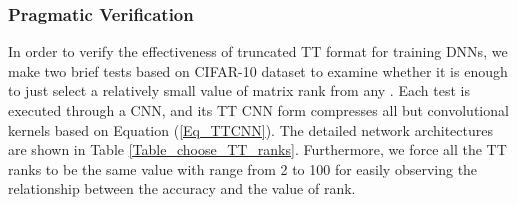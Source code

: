 \documentclass[a4paper,fleqn]{cas-dc}
\begin{document}
\subsubsection{Pragmatic Verification}\quad

In order to verify the effectiveness of truncated TT format for training DNNs, we make two brief tests based on CIFAR-10 dataset \citep{Alex_2009_CIFAR10} to examine whether it is enough to just select a relatively small value of matrix rank from any . Each test is executed through a CNN, and its TT CNN form compresses all but  convolutional kernels based on Equation (\ref{Eq_TTCNN}). The detailed network architectures are shown in Table \ref{Table_choose_TT_ranks}. Furthermore, we force all the TT ranks to be the same value with range from 2 to 100 for easily observing the relationship between the accuracy and the value of rank.

\begin{table*}
\caption{\textbf{Design of CNNs for verifying the principle to select TT ranks.} Thereinto, each content in ``Conv'' and ``Shape'' denotes a convolutional kernel  as , while its corresponding content in ``Conv'' and ``TT'' denotes the matching TT format from Equation (\ref{Eq_TTCNN}) as .}
\label{Table_choose_TT_ranks}
  \centering
  \renewcommand\arraystretch{1.6}
\end{table*}
\end{document}
